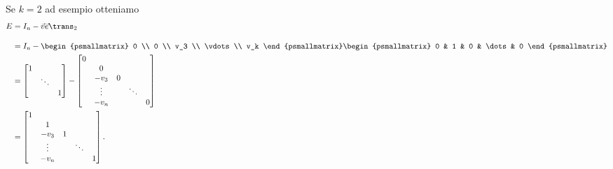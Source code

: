 \begin{example}
    Se $k = 2$ ad esempio otteniamo \begin{align*}
        E &= I_n - \vec v\vec{e}\trans_2 \\[1em]
        &= I_n - \begin{psmallmatrix}
            0 \\ 0 \\ v_3 \\ \vdots \\ v_k
        \end{psmallmatrix}\begin{psmallmatrix}
            0 & 1 & 0 & \dots & 0
        \end{psmallmatrix} \\
        &= 
        \begin{bmatrix}
            1 & &\\
              &\ddots &\\
              & &1
        \end{bmatrix}
        - \begin{bmatrix}
            0 &         &       &       &\\
              & 0       &       &       &\\
              & -v_3    &0      &       &\\
              & \vdots  &       &\ddots &\\
              & -v_n    &       &       &0
        \end{bmatrix} \\
        &= \begin{bmatrix}
            1 &         &       &       &\\
              & 1       &       &       &\\
              & -v_3    &1      &       &\\
              & \vdots  &       &\ddots &\\
              & -v_n    &       &       &1
        \end{bmatrix}.
    \end{align*}
\end{example}

